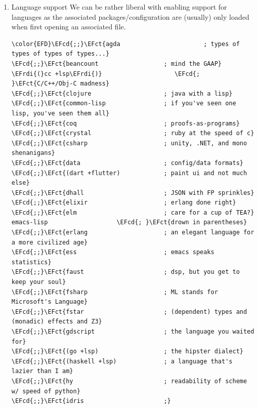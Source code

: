 \documentclass{scrartcl}
\newcommand{\EFb}[1]{\textcolor{EFb}{#1}} %
\newcommand{\EFct}[1]{\textcolor{EFct}{#1}} %
\newcommand{\EFv}[1]{\textcolor{EFv}{#1}} %
\newcommand{\EFcd}[1]{\textcolor{EFcd}{#1}} %
\newcommand{\EFrdi}[1]{#1} %
\begin{document}
\begin{enumerate}
\begin{Code}
\begin{Verbatim}[]
\color{EFD}\EFrdi{(}\EFb{:if} \EFv{IS-MAC} macos\EFrdi{)}           \EFcd{; }\EFct{improve compatibility with macOS}
\EFcd{;;}\EFct{tty                        ; improve the terminal Emacs experience}
\end{Verbatim}
\end{Code}

\item Language support
\label{sec:orga03cb88}
We can be rather liberal with enabling support for languages as the associated
packages/configuration are (usually) only loaded when first opening an
associated file.

\begin{Code}
\begin{Verbatim}[]
\color{EFD}\EFcd{;;}\EFct{agda                       ; types of types of types of types...}
\EFcd{;;}\EFct{beancount                  ; mind the GAAP}
\EFrdi{(}cc +lsp\EFrdi{)}                    \EFcd{; }\EFct{C/C++/Obj-C madness}
\EFcd{;;}\EFct{clojure                    ; java with a lisp}
\EFcd{;;}\EFct{common-lisp                ; if you've seen one lisp, you've seen them all}
\EFcd{;;}\EFct{coq                        ; proofs-as-programs}
\EFcd{;;}\EFct{crystal                    ; ruby at the speed of c}
\EFcd{;;}\EFct{csharp                     ; unity, .NET, and mono shenanigans}
\EFcd{;;}\EFct{data                       ; config/data formats}
\EFcd{;;}\EFct{(dart +flutter)            ; paint ui and not much else}
\EFcd{;;}\EFct{dhall                      ; JSON with FP sprinkles}
\EFcd{;;}\EFct{elixir                     ; erlang done right}
\EFcd{;;}\EFct{elm                        ; care for a cup of TEA?}
emacs-lisp                   \EFcd{; }\EFct{drown in parentheses}
\EFcd{;;}\EFct{erlang                     ; an elegant language for a more civilized age}
\EFcd{;;}\EFct{ess                        ; emacs speaks statistics}
\EFcd{;;}\EFct{faust                      ; dsp, but you get to keep your soul}
\EFcd{;;}\EFct{fsharp                     ; ML stands for Microsoft's Language}
\EFcd{;;}\EFct{fstar                      ; (dependent) types and (monadic) effects and Z3}
\EFcd{;;}\EFct{gdscript                   ; the language you waited for}
\EFcd{;;}\EFct{(go +lsp)                  ; the hipster dialect}
\EFcd{;;}\EFct{(haskell +lsp)             ; a language that's lazier than I am}
\EFcd{;;}\EFct{hy                         ; readability of scheme w/ speed of python}
\EFcd{;;}\EFct{idris                      ;}

\end{Verbatim}
\end{Code}
\end{enumerate}
\end{document}
